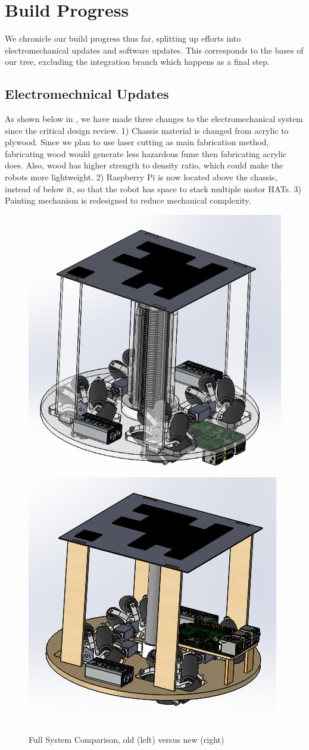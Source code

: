 
\section{Build Progress}
\label{sec:build_progress}

We chronicle our build progress thus far, splitting up efforts into electromechanical updates and software updates. This corresponds to the bases of our tree, excluding the integration branch which happens as a final step.

\subsection{Electromechnical Updates}
\label{sec:electromechanical_progress}

As shown below in , we have made three changes to the electromechanical system since the critical design review. 1) Chassis material is changed from acrylic to plywood. Since we plan to use laser cutting as main fabrication method, fabricating wood would generate less hazardous fume then fabricating acrylic does. Also, wood has higher strength to density ratio, which could make the robots more lightweight. 2) Raspberry Pi is now located above the chassis, instead of below it, so that the robot has space to stack multiple motor HATs. 3) Painting mechanism is redesigned to reduce mechanical complexity.

\begin{figure}[h!]
\centering
\includegraphics[width=0.49\columnwidth]{CAD/full_old.PNG}
\includegraphics[width=0.49\columnwidth]{CAD/full_new.PNG}
\label{fig:em1}
\caption{Full System Comparison, old (left) versus new (right)}
\end{figure}

